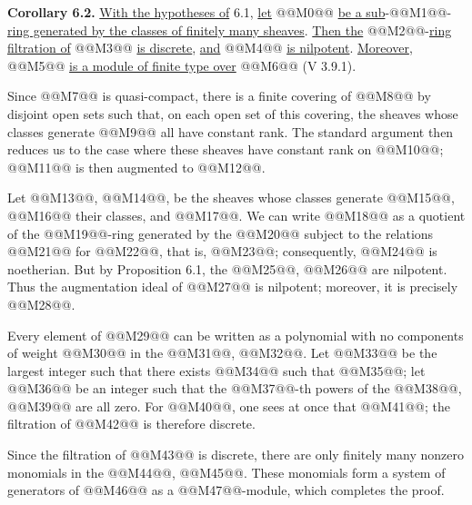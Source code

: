 \textbf{Corollary 6.2.} \uline{With the hypotheses of} 6.1, \uline{let} @@M0@@ \uline{be a sub}-@@M1@@-\uline{ring generated by the classes of finitely many sheaves}. \uline{Then the} @@M2@@-\uline{ring filtration of} @@M3@@ \uline{is discrete}, \uline{and} @@M4@@ \uline{is nilpotent}. \uline{Moreover}, @@M5@@ \uline{is a module of finite type over} @@M6@@ (V 3.9.1).

Since @@M7@@ is quasi-compact, there is a finite covering of @@M8@@ by disjoint open sets such that, on each open set of this covering, the sheaves whose classes generate @@M9@@ all have constant rank. The standard argument then reduces us to the case where these sheaves have constant rank on @@M10@@; @@M11@@ is then augmented to @@M12@@.

Let @@M13@@, @@M14@@, be the sheaves whose classes generate @@M15@@, @@M16@@ their classes, and @@M17@@. We can write @@M18@@ as a quotient of the @@M19@@-ring generated by the @@M20@@ subject to the relations @@M21@@ for @@M22@@, that is, @@M23@@; consequently, @@M24@@ is noetherian. But by Proposition 6.1, the @@M25@@, @@M26@@ are nilpotent. Thus the augmentation ideal of @@M27@@ is nilpotent; moreover, it is precisely @@M28@@.

Every element of @@M29@@ can be written as a polynomial with no components of weight @@M30@@ in the @@M31@@, @@M32@@. Let @@M33@@ be the largest integer such that there exists @@M34@@ such that @@M35@@; let @@M36@@ be an integer such that the @@M37@@-th powers of the @@M38@@, @@M39@@ are all zero. For @@M40@@, one sees at once that @@M41@@; the filtration of @@M42@@ is therefore discrete.

Since the filtration of @@M43@@ is discrete, there are only finitely many nonzero monomials in the @@M44@@, @@M45@@. These monomials form a system of generators of @@M46@@ as a @@M47@@-module, which completes the proof.

